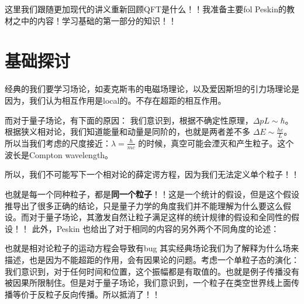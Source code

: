 这里我们跟随更加现代的讲义重新回顾QFT是什么！！我准备主要fol Peskin的教材之中的内容！学习基础的第一部分的知识！！

\section{基础探讨}
经典的我们要学习场论，如麦克斯韦的电磁场理论，以及爱因斯坦的引力场理论是因为，我们认为相互作用是local的。不存在超距的相互作用。

而对于量子场论，有下面的原因：
我们意识到，根据不确定性原理，$ \Delta p L \sim \hbar  $。根据狭义相对论，我们知道能量和动量是同阶的，也就是两者差不多 $ \Delta E \sim \frac{hc}{L} $。所以当我们考虑的尺度接近：$ \lambda = \frac{\hbar}{mc} $ 的时候，真空可能会湮灭和产生粒子。这个波长是Compton wavelength。

所以，我们不可能写下一个相对论的薛定谔方程，因为我们无法定义单个粒子！！

也就是每一个同种粒子，都是\textbf{同一个粒子}！！这是一个统计的假设，但是这个假设推导出了很多正确的结论，只是量子力学的角度我们并不能理解为什么要这么假设。而对于量子场论，其激发自然让粒子满足这样的统计规律的假设和全同性的假设！！
\line
此外，Peskin 也给出了对于相同的内容的另外两个不同角度的论述：

也就是相对论粒子的运动方程会导致有bug
其实经典场论我们为了解释为什么场来描述，也是因为不能超距的作用，会有因果论的问题。考虑一个单粒子态的演化：
我们意识到，对于任何时间和位置，这个振幅都是有取值的。也就是例子传播没有被因果所限制住。但是对于量子场论，我们意识到，一个粒子在类空世界线上面传播等价于反粒子反向传播。所以抵消了！！

